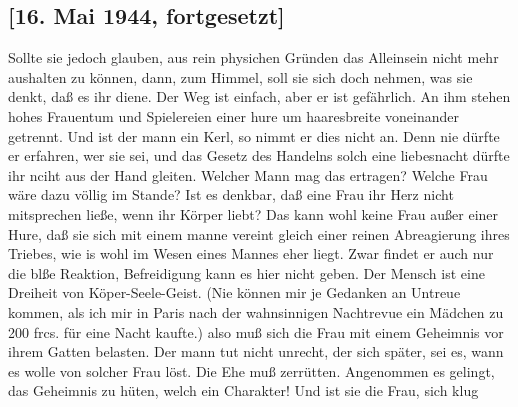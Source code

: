 \subsection{{\color{red} [16. Mai 1944, fortgesetzt] }}

Sollte sie jedoch glauben, aus rein physichen Gr\"{u}nden das Alleinsein nicht mehr aushalten zu k\"{o}nnen, dann, zum Himmel, soll sie sich doch nehmen, was sie denkt, da{\ss} es ihr diene.
Der Weg ist einfach, aber er ist gef\"{a}hrlich.
An ihm stehen hohes Frauentum und Spielereien einer hure um haaresbreite voneinander getrennt.
Und ist der mann ein Kerl, so nimmt er dies nicht an.
Denn nie d\"{u}rfte er erfahren, wer sie sei, und das Gesetz des Handelns solch eine liebesnacht d\"{u}rfte ihr nciht aus der Hand gleiten.
Welcher Mann mag das ertragen?
Welche Frau w\"{a}re dazu v\"{o}llig im Stande?
Ist es denkbar, da{\ss} eine Frau ihr Herz nicht mitsprechen lie{\ss}e, wenn ihr K\"{o}rper liebt?
Das kann wohl keine Frau au{\ss}er einer Hure, da{\ss} sie sich mit einem manne vereint gleich einer reinen Abreagierung ihres Triebes, wie is wohl im Wesen eines Mannes eher liegt.
Zwar findet er auch nur die bl{\ss}e Reaktion, Befreidigung kann es hier nicht geben.
Der Mensch ist eine Dreiheit von K\"{o}per-Seele-Geist.
(Nie k\"{o}nnen mir je Gedanken an Untreue kommen, als ich mir in Paris nach der wahnsinnigen Nachtrevue ein M\"{a}dchen zu 200 frcs. f\"{u}r eine Nacht kaufte.)
also mu{\ss} sich die Frau mit einem Geheimnis vor ihrem Gatten belasten.
Der mann tut nicht unrecht, der sich sp\"{a}ter, sei es, wann es wolle von solcher Frau l\"{o}st.
Die Ehe mu{\ss} zerr\"{u}tten.
Angenommen es gelingt, das Geheimnis zu h\"{u}ten, welch ein Charakter!
Und ist sie die Frau, sich klug

\clearpage
